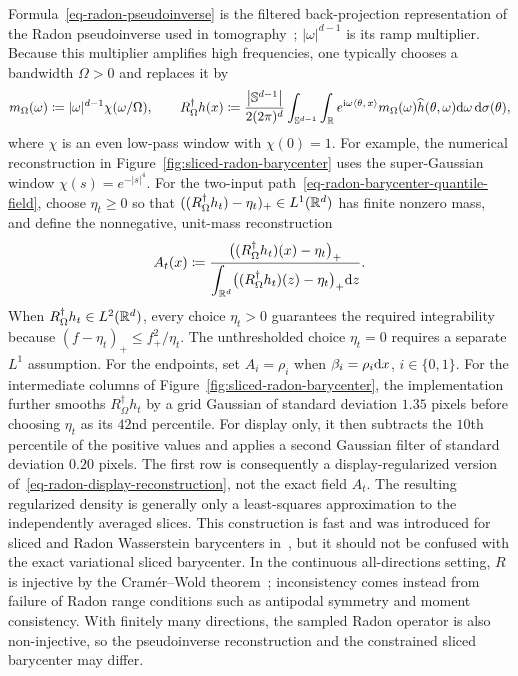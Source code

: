 Formula~\eqref{eq-radon-pseudoinverse} is the filtered back-projection representation of the Radon pseudoinverse used in tomography~\cite{HermanTomography}; $|\omega|^{d-1}$ is its ramp multiplier. Because this multiplier amplifies high frequencies, one typically chooses a bandwidth $\Omega>0$ and replaces it by
\begin{equation}\label{eq-radon-windowed-ramp}
	m_\Omega(\omega)
	\coloneqq
	|\omega|^{d-1}\chi(\omega/\Omega),
	\qquad
	R_\Omega^\dagger h(x)
	\coloneqq
	\frac{\left\lvert\mathbb{S}^{d-1}\right\rvert}{2(2\pi)^d}
	\int_{\mathbb{S}^{d-1}}\int_{\mathbb{R}}
	e^{\mathrm{i}\omega\langle \theta,\,x\rangle}
	m_\Omega(\omega)\widehat h(\theta,\omega)
	\mathrm{d}\omega\,\mathrm{d}\sigma(\theta),
\end{equation}
where $\chi$ is an even low-pass window with $\chi(0)=1$. For example, the numerical reconstruction in Figure~\ref{fig:sliced-radon-barycenter} uses the super-Gaussian window $\chi(s)=e^{-|s|^4}$. For the two-input path~\eqref{eq-radon-barycenter-quantile-field}, choose $\eta_t\geq0$ so that $((R_\Omega^\dagger h_t)-\eta_t)_+\in L^1(\mathbb{R}^d)$ has finite nonzero mass, and define the nonnegative, unit-mass reconstruction
\begin{equation}\label{eq-radon-display-reconstruction}
	A_t(x)
	\coloneqq
	\frac{\bigl((R_\Omega^\dagger h_t)(x)-\eta_t\bigr)_+}
	{\displaystyle\int_{\mathbb{R}^d}\bigl((R_\Omega^\dagger h_t)(z)-\eta_t\bigr)_+\mathrm{d} z}.
\end{equation}
When $R_\Omega^\dagger h_t\in L^2(\mathbb{R}^d)$, every choice $\eta_t>0$ guarantees the required integrability because $(f-\eta_t)_+\leq f_+^2/\eta_t$. The unthresholded choice $\eta_t=0$ requires a separate $L^1$ assumption.
For the endpoints, set $A_i=\rho_i$ when $\beta_i=\rho_i\mathrm{d} x$, $i\in\{0,1\}$. For the intermediate columns of Figure~\ref{fig:sliced-radon-barycenter}, the implementation further smooths $R_\Omega^\dagger h_t$ by a grid Gaussian of standard deviation $1.35$ pixels before choosing $\eta_t$ as its $42$nd percentile. For display only, it then subtracts the $10$th percentile of the positive values and applies a second Gaussian filter of standard deviation $0.20$ pixels. The first row is consequently a display-regularized version of~\eqref{eq-radon-display-reconstruction}, not the exact field $A_t$. The resulting regularized density is generally only a least-squares approximation to the independently averaged slices. This construction is fast and was introduced for sliced and Radon Wasserstein barycenters in~\cite{2013-Bonneel-barycenter}, but it should not be confused with the exact variational sliced barycenter. In the continuous all-directions setting, $R$ is injective by the Cram\'er--Wold theorem~\cite{CramerWold1936}; inconsistency comes instead from failure of Radon range conditions such as antipodal symmetry and moment consistency. With finitely many directions, the sampled Radon operator is also non-injective, so the pseudoinverse reconstruction and the constrained sliced barycenter may differ.

